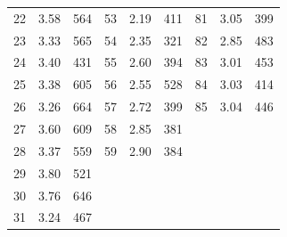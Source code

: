 \begin{mvtable}
\begin{tabular}{ccccccccc}
22 & 3.58 & 564 & 53 & 2.19 & 411 & 81 & 3.05 & 399\\
23 & 3.33 & 565 & 54 & 2.35 & 321 & 82 & 2.85 & 483\\
24 & 3.40 & 431 & 55 & 2.60 & 394 & 83 & 3.01 & 453\\
25 & 3.38 & 605 & 56 & 2.55 & 528 & 84 & 3.03 & 414\\
26 & 3.26 & 664 & 57 & 2.72 & 399 & 85 & 3.04 & 446\\
27 & 3.60 & 609 & 58 & 2.85 & 381 & & & \\
28 & 3.37 & 559 & 59 & 2.90 & 384 & & & \\
29 & 3.80 & 521 & & & & & & \\
30 & 3.76 & 646 & & & & & & \\
31 & 3.24 & 467 & & & & & & \\
\bottomrule
\end{tabular}
\end{mvtable}
